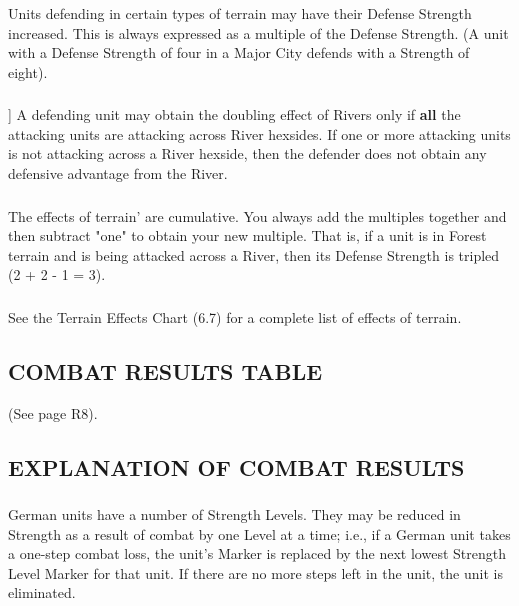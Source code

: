 \subsubsection{} Units defending in certain types of terrain may have their Defense Strength increased. This is always expressed as a multiple of the Defense Strength. (A unit with a Defense Strength of four in a Major City defends with a Strength of eight).

\subsubsection{}] A defending unit may obtain the doubling effect of Rivers only if \textbf{all} the attacking units are attacking across River hexsides. If one or more attacking units is not attacking across a River hexside, then the defender does not obtain any defensive advantage from the River.

\subsubsection{} The effects of terrain' are cumulative. You always add the multiples together and then subtract "one" to obtain your new multiple. That is, if a unit is in Forest terrain and is being attacked across a River, then its Defense Strength is tripled (2 + 2 - 1 = 3).

\subsubsection{} See the Terrain Effects Chart (6.7) for a complete list of effects of terrain.

\subsection{COMBAT RESULTS TABLE} (See page R8).

\subsection{EXPLANATION OF COMBAT RESULTS}

\subsubsection{} German units have a number of Strength Levels. They may be reduced in Strength as a result of combat by one Level at a time; i.e., if a German unit takes a one-step combat loss, the unit's Marker is replaced by the next lowest Strength Level Marker for that unit. If there are no more steps left in the unit, the unit is eliminated.


